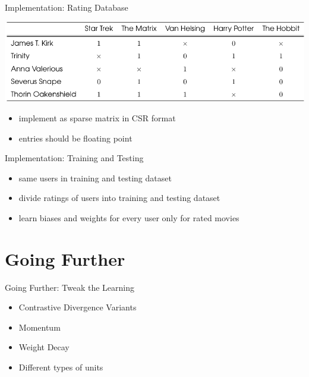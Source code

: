 \documentclass[aspectratio=169]{beamer}
\begin{document}
    \begin{frame}{Implementation: Rating Database}
      \begin{center}
        \includegraphics[height=0.35\textheight]{figures/problem-example.pdf}
      \end{center}
      \vfill
      \begin{itemize}
        \pause
        \item implement as sparse matrix in CSR format
        \pause
        \item entries should be floating point
      \end{itemize}
    \end{frame}

    \begin{frame}{Implementation: Training and Testing}
      \begin{itemize}
        \item same users in training and testing dataset
        \pause
        \item divide ratings of users into training and testing dataset
        \pause
        \item learn biases and weights for every user only for rated movies
      \end{itemize}
    \end{frame}



  \section{Going Further} %
  \label{sec:Going Further}
    \begin{frame}{Going Further: Tweak the Learning}
      \begin{itemize}
        \item Contrastive Divergence Variants
        \item Momentum
        \item Weight Decay
        \item Different types of units
      \end{itemize}
    \end{frame}
\end{document}

